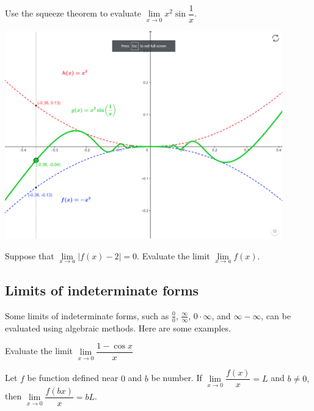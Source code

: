   
\begin{example}
Use the squeeze theorem to evaluate
\(\lim\limits_{x\to0}x^2\sin\dfrac{1}{x}\).

\href{https://www.geogebra.org/m/gb9uqf9u}{\includegraphics[width=0.9\textwidth]{img/image-20200830161044604.png}}
\end{example}
\vspace*{6\baselineskip}

\begin{example}
Suppose that
\(\lim\limits_{x\to a}\lvert f(x)-2\rvert =0\). Evaluate the limit
\(\lim\limits_{x\to a}f(x)\).
\end{example}
\vspace*{6\baselineskip}

\hypertarget{limits-of-indeterminate-forms}{%
\subsection{Limits of indeterminate
forms}\label{limits-of-indeterminate-forms}}

Some limits of indeterminate forms, such as \(\frac00\),
\(\frac{\infty}{\infty}\), \(0\cdot \infty\), and \(\infty-\infty\), can
be evaluated using algebraic methods. Here are some examples.

\begin{example}
Evaluate the limit
\(\lim\limits_{x\to 0}\dfrac{1-\cos x}{x}\)
\end{example}
\vspace*{6\baselineskip}

\begin{proposition}
  Let \(f\) be function defined near \(0\) and \(b\)
  be number. If \(\lim\limits_{x\to 0}\dfrac{f(x)}{x}=L\) and
  \(b \neq 0,\) then \(\lim\limits_{x \to 0}\dfrac{f(bx)}{x}=bL\).
\end{proposition}

